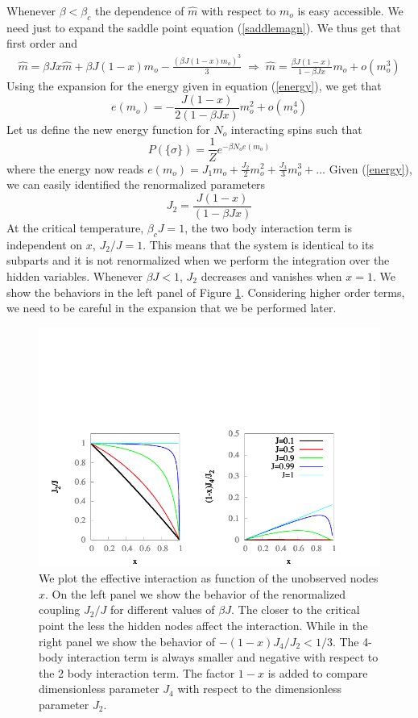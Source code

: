 \documentclass[aps,pre,noshowpacs]{revtex4}
\begin{document}
Whenever $\beta<\beta_c$ the dependence of $\hat{m}$ with respect to $m_o$ is easy accessible.
We need just to expand the saddle point equation (\ref{saddlemagn}). We thus get that first order and
\begin{eqnarray}
\hat{m}= \beta J x \hat{m} + \beta J (1-x) m_o - \frac{(\beta J (1-x)m_o)^3}{3} \;\Rightarrow\; \hat{m}= \frac{\beta J (1-x)}{ 1-\beta J x} m_o + o(m_o^3)
\end{eqnarray}
Using the expansion for the energy given in equation (\ref{energy}), we get that 
\begin{equation}\label{energy}
e(m_o) = -\frac{J (1-x) }{2 (1-\beta J x)} m_o^2  + o(m_o^4)
 \end{equation}
Let us define the new energy function for $N_o$ interacting spins such that
\begin{equation} 
P(\{ \sigma\}) = \frac{1}{Z} e^{-\beta N_o e(m_o)}
\end{equation}
where the energy now reads $ e(m_o)=  J_1 m_o+\frac{J_2}{2} m_o^2+ \frac{J_3}{3} m_o^3  +\ldots$
Given (\ref{energy}), we can easily identified the renormalized parameters
$$J_2= \frac{J (1-x) }{ (1-\beta J x)}$$
At the critical temperature, $\beta_c J =1$, the two body interaction term is independent on $x$, $J_2/J=1$. This means
that the system is identical to its subparts and it is not renormalized when we perform the integration over the hidden variables. 
Whenever $\beta J<1$, $J_2$ decreases and vanishes when $x=1$. We show the behaviors in the left panel of Figure \ref{fig:aboveTc}. Considering higher order terms, we need to be careful in the expansion that we be performed later.
\begin{figure}
\includegraphics[width=.7\columnwidth,angle=0]{AboveTc.pdf}
\caption{We plot the effective interaction as function of the unobserved nodes $x$. On the left panel we show the behavior of 
the renormalized coupling $J_2/J$ for different values of $\beta J$. The closer to the critical point the less the hidden nodes affect
the interaction. While in the right panel we show the behavior of $-(1-x) J_4/J_2<1/3$. The 4-body interaction term is always smaller and negative with respect to the 2 body interaction term. The factor $1-x$ is added to compare dimensionless parameter $J_4$ with respect to the dimensionless parameter $J_2$.}
\label{fig:aboveTc}
\end{figure}
\end{document}
